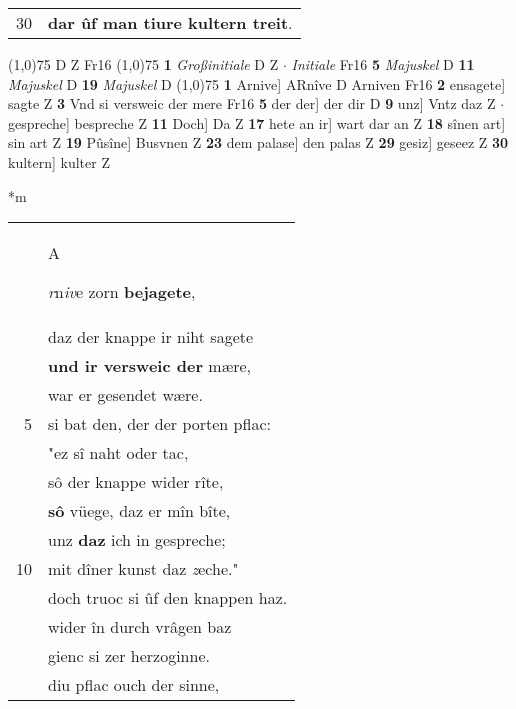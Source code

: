 \documentclass[8pt,a4paper,notitlepage]{article}
\begin{document}
\begin{table}[ht]
\begin{minipage}[t]{0.5\linewidth}
\begin{tabular}{rl}
30 & \textbf{dar ûf man tiure kultern treit}.\\ 
\end{tabular}
\scriptsize
\line(1,0){75} \newline
D Z Fr16 \newline
\line(1,0){75} \newline
\textbf{1} \textit{Großinitiale} D Z   $\cdot$ \textit{Initiale} Fr16  \textbf{5} \textit{Majuskel} D  \textbf{11} \textit{Majuskel} D  \textbf{19} \textit{Majuskel} D  \newline
\line(1,0){75} \newline
\textbf{1} Arnive] ARnîve D Arniven Fr16 \textbf{2} ensagete] sagte Z \textbf{3} Vnd si versweic der mere Fr16 \textbf{5} der der] der dir D \textbf{9} unz] Vntz daz Z  $\cdot$ gespreche] bespreche Z \textbf{11} Doch] Da Z \textbf{17} hete an ir] wart dar an Z \textbf{18} sînen art] sin art Z \textbf{19} Pûsîne] Busvnen Z \textbf{23} dem palase] den palas Z \textbf{29} gesiz] geseez Z \textbf{30} kultern] kulter Z \newline
\end{minipage}
\hspace{0.5cm}
\begin{minipage}[t]{0.5\linewidth}
\small
\begin{center}*m
\end{center}
\begin{tabular}{rl}
 & \begin{large}A\end{large}\textit{r}n\textit{iv}e zorn \textbf{bejagete},\\ 
 & daz der knappe ir niht sagete\\ 
 & \textbf{und ir versweic der} mære,\\ 
 & war er gesendet wære.\\ 
5 & si bat den, der der porten pflac:\\ 
 & "ez sî naht oder tac,\\ 
 & sô der knappe wider rîte,\\ 
 & \textbf{sô} vüege, daz er mîn bîte,\\ 
 & unz \textbf{daz} ich in gespreche;\\ 
10 & mit dîner kunst daz \textit{z}eche."\\ 
 & doch truoc si ûf den knappen haz.\\ 
 & wider în durch vrâgen baz\\ 
 & gienc si zer herzoginne.\\ 
 & diu pflac ouch der sinne,\\ 

\end{tabular}
\end{minipage}
\end{table}
\end{document}
